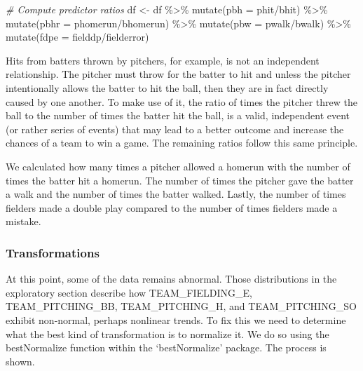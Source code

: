 \documentclass[
]{article}
\newenvironment{Shaded}{\begin{snugshade}}{\end{snugshade}}
\newcommand{\AttributeTok}[1]{\textcolor[rgb]{0.77,0.63,0.00}{#1}}
\newcommand{\CommentTok}[1]{\textcolor[rgb]{0.56,0.35,0.01}{\textit{#1}}}
\newcommand{\FunctionTok}[1]{\textcolor[rgb]{0.00,0.00,0.00}{#1}}
\newcommand{\NormalTok}[1]{#1}
\newcommand{\OtherTok}[1]{\textcolor[rgb]{0.56,0.35,0.01}{#1}}
\newcommand{\SpecialCharTok}[1]{\textcolor[rgb]{0.00,0.00,0.00}{#1}}
\begin{document}
\begin{Shaded}
\begin{Highlighting}[]
\CommentTok{\# Compute predictor ratios}
\NormalTok{df }\OtherTok{\textless{}{-}}\NormalTok{ df }\SpecialCharTok{\%\textgreater{}\%} 
  \FunctionTok{mutate}\NormalTok{(}\AttributeTok{pbh =}\NormalTok{ phit}\SpecialCharTok{/}\NormalTok{bhit) }\SpecialCharTok{\%\textgreater{}\%} 
  \FunctionTok{mutate}\NormalTok{(}\AttributeTok{pbhr =}\NormalTok{ phomerun}\SpecialCharTok{/}\NormalTok{bhomerun) }\SpecialCharTok{\%\textgreater{}\%} 
  \FunctionTok{mutate}\NormalTok{(}\AttributeTok{pbw =}\NormalTok{ pwalk}\SpecialCharTok{/}\NormalTok{bwalk) }\SpecialCharTok{\%\textgreater{}\%} 
  \FunctionTok{mutate}\NormalTok{(}\AttributeTok{fdpe =}\NormalTok{ fielddp}\SpecialCharTok{/}\NormalTok{fielderror)}
\end{Highlighting}
\end{Shaded}

Hits from batters thrown by pitchers, for example, is not an independent
relationship. The pitcher must throw for the batter to hit and unless
the pitcher intentionally allows the batter to hit the ball, then they
are in fact directly caused by one another. To make use of it, the ratio
of times the pitcher threw the ball to the number of times the batter
hit the ball, is a valid, independent event (or rather series of events)
that may lead to a better outcome and increase the chances of a team to
win a game. The remaining ratios follow this same principle.

We calculated how many times a pitcher allowed a homerun with the number
of times the batter hit a homerun. The number of times the pitcher gave
the batter a walk and the number of times the batter walked. Lastly, the
number of times fielders made a double play compared to the number of
times fielders made a mistake.

\hypertarget{transformations}{%
\subsubsection{Transformations}\label{transformations}}

At this point, some of the data remains abnormal. Those distributions in
the exploratory section describe how TEAM\_FIELDING\_E,
TEAM\_PITCHING\_BB, TEAM\_PITCHING\_H, and TEAM\_PITCHING\_SO exhibit
non-normal, perhaps nonlinear trends. To fix this we need to determine
what the best kind of transformation is to normalize it. We do so using
the bestNormalize function within the `bestNormalize' package. The
process is shown.
\end{document}
